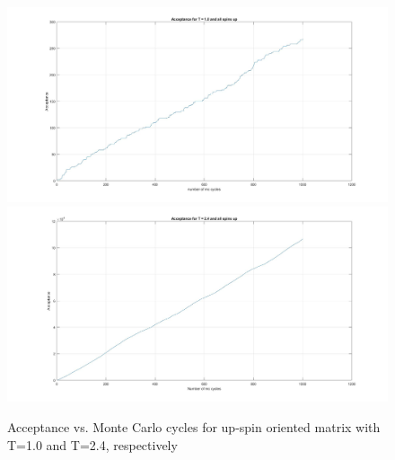 \documentclass[10pt,a4paper]{article}
\begin{document}
\begin{figure}[H]
\centerline{
\includegraphics[scale=0.15]{acceptanceMCT1upspin}
\includegraphics[scale=0.15]{acceptanceMCT24upspin}
}
\caption{Acceptance vs. Monte Carlo cycles for up-spin oriented matrix with T=1.0 and T=2.4, respectively}
\label{fig:accup}
\end{figure}
\end{document}
